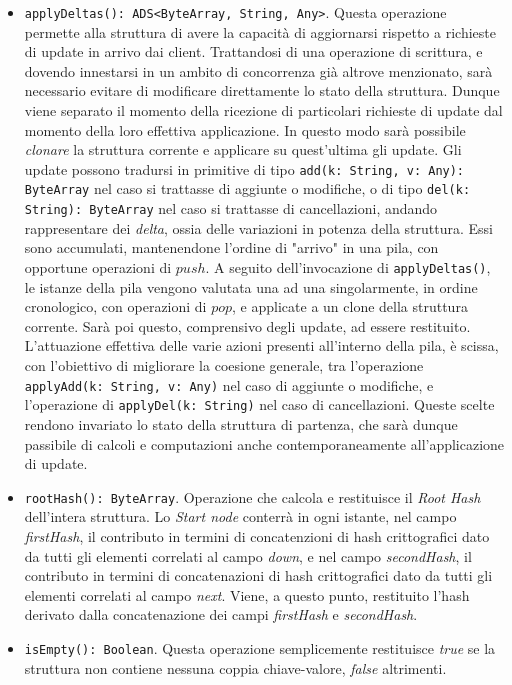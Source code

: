 \begin{itemize}
		\item \verb!applyDeltas(): ADS<ByteArray, String, Any>!. Questa operazione permette alla struttura di avere la capacità di aggiornarsi rispetto a richieste di update in arrivo dai client. Trattandosi di una operazione di scrittura, e dovendo innestarsi in un ambito di concorrenza già altrove menzionato, sarà necessario evitare di modificare direttamente lo stato della struttura. Dunque viene separato il momento della ricezione di particolari richieste di update dal momento della loro effettiva applicazione. In questo modo sarà possibile \textit{clonare} la struttura corrente e applicare su quest'ultima gli update. Gli update possono tradursi in primitive di tipo \verb!add(k: String, v: Any): ByteArray! nel caso si trattasse di aggiunte o modifiche, o di tipo \verb!del(k: String): ByteArray! nel caso si trattasse di cancellazioni, andando rappresentare dei \textit{delta}, ossia delle variazioni in potenza della struttura. Essi sono accumulati, mantenendone l'ordine di "arrivo" in una pila, con opportune operazioni di $ push $. A seguito dell'invocazione di \verb!applyDeltas()!, le istanze della pila vengono valutata una ad una singolarmente, in ordine cronologico, con operazioni di $ pop $, e applicate a un clone della struttura corrente. Sarà poi questo, comprensivo degli update, ad essere restituito.
		L'attuazione effettiva delle varie azioni presenti all'interno della pila, è scissa, con l'obiettivo di migliorare la coesione generale, tra l'operazione \verb!applyAdd(k: String, v: Any)! nel caso di aggiunte o modifiche, e l'operazione di \verb!applyDel(k: String)! nel caso di cancellazioni.
		Queste scelte rendono invariato lo stato della struttura di partenza, che sarà dunque passibile di calcoli e computazioni anche contemporaneamente all'applicazione di update.
					
		\item \verb!rootHash(): ByteArray!. Operazione che calcola e restituisce il \textit{Root Hash} dell'intera struttura. Lo \textit{Start node} conterrà in ogni istante, nel campo \textit{firstHash}, il contributo in termini di concatenzioni di hash crittografici dato da tutti gli elementi correlati al campo \textit{down}, e nel campo \textit{secondHash}, il contributo in termini di concatenazioni di hash crittografici dato da tutti gli elementi correlati al campo \textit{next}. Viene, a questo punto, restituito l'hash derivato dalla concatenazione dei campi \textit{firstHash} e \textit{secondHash}.
			
		\item \verb!isEmpty(): Boolean!. Questa operazione semplicemente restituisce \textit{true} se la struttura non contiene nessuna coppia chiave-valore, \textit{false} altrimenti.


\end{itemize}
